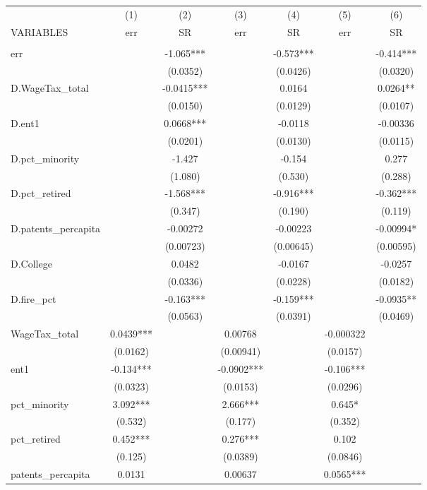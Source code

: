 \begin{tabular}{lcccccc} \hline
 & (1) & (2) & (3) & (4) & (5) & (6) \\
VARIABLES & err & SR & err & SR & err & SR \\ \hline
 &  &  &  &  &  &  \\
err &  & -1.065*** &  & -0.573*** &  & -0.414*** \\
 &  & (0.0352) &  & (0.0426) &  & (0.0320) \\
D.WageTax\_total &  & -0.0415*** &  & 0.0164 &  & 0.0264** \\
 &  & (0.0150) &  & (0.0129) &  & (0.0107) \\
D.ent1 &  & 0.0668*** &  & -0.0118 &  & -0.00336 \\
 &  & (0.0201) &  & (0.0130) &  & (0.0115) \\
D.pct\_minority &  & -1.427 &  & -0.154 &  & 0.277 \\
 &  & (1.080) &  & (0.530) &  & (0.288) \\
D.pct\_retired &  & -1.568*** &  & -0.916*** &  & -0.362*** \\
 &  & (0.347) &  & (0.190) &  & (0.119) \\
D.patents\_percapita &  & -0.00272 &  & -0.00223 &  & -0.00994* \\
 &  & (0.00723) &  & (0.00645) &  & (0.00595) \\
D.College &  & 0.0482 &  & -0.0167 &  & -0.0257 \\
 &  & (0.0336) &  & (0.0228) &  & (0.0182) \\
D.fire\_pct &  & -0.163*** &  & -0.159*** &  & -0.0935** \\
 &  & (0.0563) &  & (0.0391) &  & (0.0469) \\
WageTax\_total & 0.0439*** &  & 0.00768 &  & -0.000322 &  \\
 & (0.0162) &  & (0.00941) &  & (0.0157) &  \\
ent1 & -0.134*** &  & -0.0902*** &  & -0.106*** &  \\
 & (0.0323) &  & (0.0153) &  & (0.0296) &  \\
pct\_minority & 3.092*** &  & 2.666*** &  & 0.645* &  \\
 & (0.532) &  & (0.177) &  & (0.352) &  \\
pct\_retired & 0.452*** &  & 0.276*** &  & 0.102 &  \\
 & (0.125) &  & (0.0389) &  & (0.0846) &  \\
patents\_percapita & 0.0131 &  & 0.00637 &  & 0.0565*** &  \\

\end{tabular}
